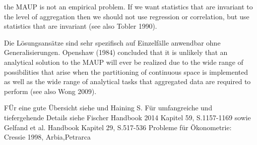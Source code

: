 the MAUP is not an empirical problem. If we want statistics that are invariant to the level of aggregation then we should not use regression or correlation, but use
statistics that are invariant (see also Tobler 1990).

Die Lösungsansätze sind sehr spezifisch auf Einzelfälle anwendbar ohne Generalisierungen. 
Openshaw (1984) concluded that it is unlikely that an analytical solution to the MAUP will ever be realized due to the wide range of possibilities 
that arise when the partitioning of continuous space is implemented as well as the wide range of analytical tasks that aggregated data are required to perform (see also Wong 2009). 



FÜr eine gute Übersicht siehe \cite[S.104]{waller_applied_2004} und Haining S. 
Für umfangreiche und tiefergehende Details siehe Fischer Handbook 2014 Kapitel 59, S.1157-1169
sowie Gelfand et al. Handbook Kapitel 29, S.517-536 
Probleme für Ökonometrie: Cressie 1998, Arbia,Petrarca


% 

